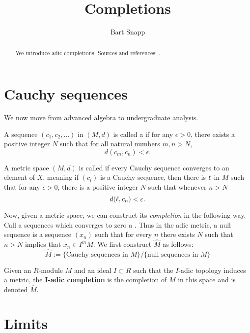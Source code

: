 \documentclass{ximera}
\author{Bart Snapp}
\title{Completions}
\begin{document}
\begin{abstract}
  We introduce adic completions. Sources and references:
  \cite{AK2012,AM1969,sD2008}.
\end{abstract}
\maketitle



\section{Cauchy sequences}


We now move from advanced algebra to undergraduate analysis.



\begin{definition}
  A sequence $(c_1,c_2,\dots)$ in $(M,d)$ is called a  if for any $\epsilon>0$, there exists a positive integer
  $N$ such that for all natural numbers $m,n>N$,
  \[
  d(c_m,c_n) < \epsilon.
  \]
\end{definition}

\begin{definition}
  A metric space $(M,d)$ is called  if every Cauchy
  sequence converges to an element of $X$, meaning if $(c_i)$ is a
  Cauchy sequence, then there is $\ell$ in $M$ such that for any
  $\epsilon>0$, there is a positive integer $N$ such that whenever $n>N$
  \[
  d(\ell,c_n) < \varepsilon.
  \]
\end{definition}

Now, given a metric space, we can construct its \textit{completion} in
the following way. Call a sequences which converges to zero a
. Thus in the adic metric, a
null sequence is a sequence $(x_n)$ such that for every $n$ there
exists $N$ such that $n > N$ implies that $x_n \in I^mM$.  We first
construct $\hat{M}$ as follows:
\[
\hat{M} := \{\text{Cauchy sequences in $M$}\}/\{\text{null sequences in $M$}\}
\]

\begin{definition}
  Given an $R$-module $M$ and an ideal $I\subset R$ such that the
  $I$-adic topology induces a metric, the
  \textbf{$\boldsymbol{I}$-adic completion} is the completion of $M$
  in this space and is denoted $\hat{M}$.
\end{definition}



\section{Limits}
\end{document}
